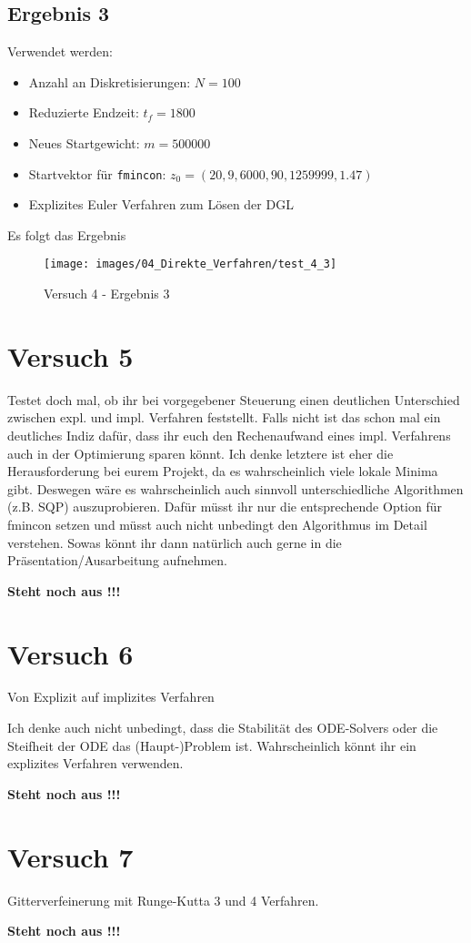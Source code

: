 \subsection{Ergebnis 3}
Verwendet werden:
\begin{itemize}
\item Anzahl an Diskretisierungen: $N = 100$ 
\item Reduzierte Endzeit: $t_f = 1800$
\item Neues Startgewicht: $m = 500000$
\item Startvektor für \texttt{fmincon}: $z_0 = (20,9,6000,90,1259999,1.47)$
\item Explizites Euler Verfahren zum Lösen der DGL
\end{itemize}
Es folgt das Ergebnis
\begin{figure}[H]
\begin{center}
\texttt{[image: images/04\_Direkte\_Verfahren/test\_4\_3]}
\caption{Versuch 4 - Ergebnis 3}\label{img:test_4_3}
\end{center}
\end{figure}







\newpage
\section{Versuch 5}
Testet doch mal, ob ihr bei vorgegebener Steuerung einen deutlichen Unterschied zwischen expl. und impl. Verfahren feststellt. Falls nicht ist das schon mal ein deutliches Indiz dafür, dass ihr euch den Rechenaufwand eines impl. Verfahrens auch in der Optimierung sparen könnt. Ich denke letztere ist eher die Herausforderung bei eurem Projekt, da es wahrscheinlich viele lokale Minima gibt. Deswegen wäre es wahrscheinlich auch sinnvoll unterschiedliche Algorithmen (z.B. SQP) auszuprobieren. Dafür müsst ihr nur die entsprechende Option für fmincon setzen und müsst auch nicht unbedingt den Algorithmus im Detail verstehen. Sowas könnt ihr dann natürlich auch gerne in die Präsentation/Ausarbeitung aufnehmen.

\textbf{Steht noch aus !!!}





\newpage
\section{Versuch 6}
Von Explizit auf implizites Verfahren

Ich denke auch nicht unbedingt, dass die Stabilität des ODE-Solvers oder die Steifheit der ODE das (Haupt-)Problem ist. Wahrscheinlich könnt ihr ein explizites Verfahren verwenden.

\textbf{Steht noch aus !!!}







\newpage
\section{Versuch 7}
Gitterverfeinerung mit Runge-Kutta 3 und 4 Verfahren.

\textbf{Steht noch aus !!!}